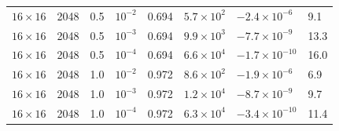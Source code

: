 \begin{table}
\begin{tabular}{llllllll}
$16\times16$ & 2048 & 0.5 & $10^{-2}$ & 0.694 & $5.7\times10^{2}$ & $-2.4\times10^{-6}$ & 9.1 \\
$16\times16$ & 2048 & 0.5 & $10^{-3}$ & 0.694 & $9.9\times10^{3}$ & $-7.7\times10^{-9}$ & 13.3 \\
$16\times16$ & 2048 & 0.5 & $10^{-4}$ & 0.694 & $6.6\times10^{4}$ & $-1.7\times10^{-10}$ & 16.0 \\
$16\times16$ & 2048 & 1.0 & $10^{-2}$ & 0.972 & $8.6\times10^{2}$ & $-1.9\times10^{-6}$ & 6.9 \\
$16\times16$ & 2048 & 1.0 & $10^{-3}$ & 0.972 & $1.2\times10^{4}$ & $-8.7\times10^{-9}$ & 9.7 \\
$16\times16$ & 2048 & 1.0 & $10^{-4}$ & 0.972 & $6.3\times10^{4}$ & $-3.4\times10^{-10}$ & 11.4 \\
\bottomrule
\end{tabular}
\end{table}

